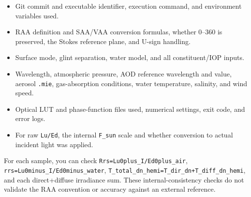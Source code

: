 \begin{itemize}
\item Git commit and executable identifier, execution command, and environment variables used.
\item RAA definition and SAA/VAA conversion formulas, whether 0--360\textdegree{} is preserved, the Stokes reference plane, and U-sign handling.
\item Surface mode, glint separation, water model, and all constituent/IOP inputs.
\item Wavelength, atmospheric pressure, AOD reference wavelength and value, aerosol \texttt{.\allowbreak{}mie}, gas-absorption conditions, water temperature, salinity, and wind speed.
\item Optical LUT and phase-function files used, numerical settings, exit code, and error logs.
\item For raw \texttt{Lu/\allowbreak{}Ed}, the internal \texttt{F\_\allowbreak{}sun} scale and whether conversion to actual incident light was applied.
\end{itemize}

For each sample, you can check \texttt{Rrs=\allowbreak{}Lu0plus\_\allowbreak{}I/\allowbreak{}Ed0plus\_\allowbreak{}air}, \texttt{rrs=\allowbreak{}Lu0minus\_\allowbreak{}I/\allowbreak{}Ed0minus\_\allowbreak{}water}, \texttt{T\_\allowbreak{}total\_\allowbreak{}dn\_\allowbreak{}hemi=\allowbreak{}T\_\allowbreak{}dir\_\allowbreak{}dn+T\_\allowbreak{}diff\_\allowbreak{}dn\_\allowbreak{}hemi}, and each direct+diffuse irradiance sum. These internal-consistency checks do not validate the RAA convention or accuracy against an external reference.

